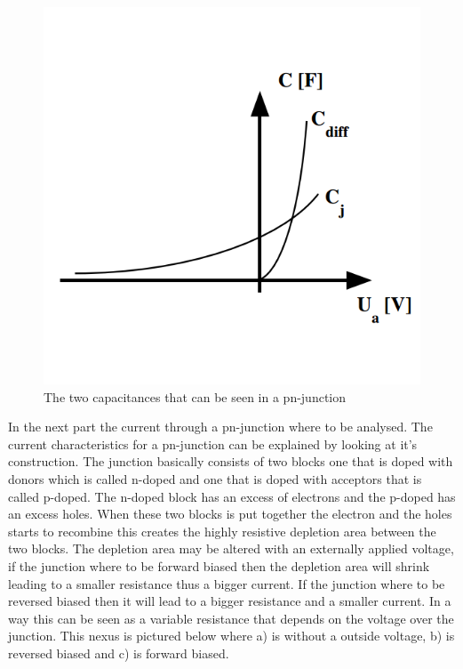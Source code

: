 \documentclass[a4paper]{article}
\begin{document}
\begin{figure}[H]
\centering
\includegraphics[scale=0.3]{capp.png}
\caption{The two capacitances that can be seen in a pn-junction}
\label{capp}
\end{figure}

In the next part the current through a pn-junction where to be analysed. The current characteristics for a pn-junction can be explained by looking at it's construction. The junction basically consists of two blocks one that is doped with donors which is called n-doped and one that is doped with acceptors that is called p-doped. The n-doped block has an excess of electrons and the p-doped has an excess holes. When these two blocks is put together the electron and the holes starts to recombine this creates the highly resistive depletion area between the two blocks. The depletion area may be altered with an externally applied voltage, if the junction where to be forward biased then the depletion area will shrink leading to a smaller resistance thus a bigger current. If the junction where to be reversed biased then it will lead to a bigger resistance and a smaller current. In a way this can be seen as a variable resistance that depends on the voltage over the junction. This nexus is pictured below where a) is without a outside voltage, b) is reversed biased and c) is forward biased.
\end{document}
